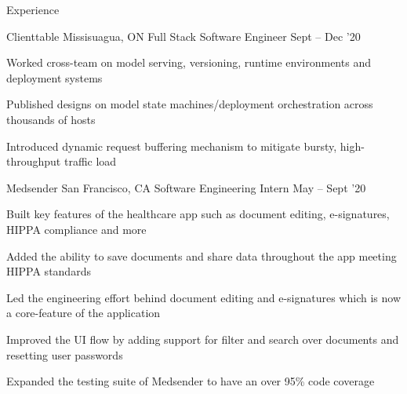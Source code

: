 \documentclass{resume} %
\begin{document}
\begin{rSection}{Experience}

  \begin{rWorkSection}{Clienttable}
                      {Missisuagua, ON}
                      {Full Stack Software Engineer }
                      {Sept -- Dec '20}
  {
    \item Worked cross-team on model serving, versioning, runtime environments and
      deployment systems
    \item Published designs on model state
      machines/deployment orchestration across thousands of hosts
    \item Introduced dynamic request buffering mechanism to mitigate bursty,
      high-throughput traffic load
  }
  \end{rWorkSection}

  \begin{rWorkSection}{Medsender}
                     {San Francisco, CA}
                     {Software Engineering Intern}
                     {May -- Sept '20}
  {
    \item Built key features of the healthcare app such as document 
      editing, e-signatures, HIPPA compliance and more
    \item Added the ability to save documents and share data
      throughout the app meeting HIPPA standards
    \item Led the engineering effort behind document editing and 
      e-signatures which is now a core-feature of the application
    \item Improved the UI flow by adding support for filter and 
      search over documents and resetting user passwords
    \item Expanded the testing suite of Medsender to have an over 95\% code 
      coverage
  }
  \end{rWorkSection}

\end{rSection}


\end{document}
